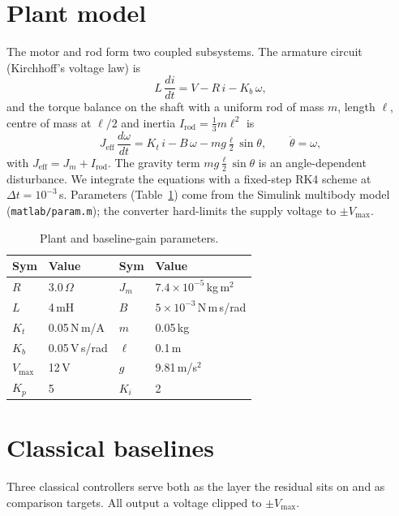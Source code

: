 \documentclass[10pt,twocolumn]{article}
\begin{document}
\section{Plant model}
The motor and rod form two coupled subsystems. The armature circuit
(Kirchhoff's voltage law) is
\begin{equation}
  L\,\frac{di}{dt} = V - R\,i - K_b\,\omega ,
  \label{eq:elec}
\end{equation}
and the torque balance on the shaft with a uniform rod of mass $m$,
length $\ell$, centre of mass at $\ell/2$ and inertia
$I_{\mathrm{rod}}=\tfrac13 m\ell^2$ is
\begin{equation}
  J_{\mathrm{eff}}\,\frac{d\omega}{dt}
    = K_t\,i - B\,\omega - m g \tfrac{\ell}{2}\sin\theta,
  \qquad \dot\theta = \omega,
  \label{eq:mech}
\end{equation}
with $J_{\mathrm{eff}}=J_m+I_{\mathrm{rod}}$. The gravity term
$m g \tfrac{\ell}{2}\sin\theta$ is an angle-dependent disturbance. We
integrate the equations with a fixed-step RK4 scheme at
$\Delta t=10^{-3}$\,s. Parameters (Table~\ref{tab:params}) come from the
Simulink multibody model (\texttt{matlab/param.m}); the converter
hard-limits the supply voltage to $\pm V_{\max}$.

\begin{table}[h]
\centering
\caption{Plant and baseline-gain parameters.}
\label{tab:params}
\small
\begin{tabular}{llll}
\toprule
\textbf{Sym} & \textbf{Value} & \textbf{Sym} & \textbf{Value}\\
\midrule
$R$   & 3.0\,$\Omega$        & $J_m$  & $7.4\times10^{-5}$\,kg\,m$^2$\\
$L$   & 4\,mH                & $B$    & $5\times10^{-3}$\,N\,m\,s/rad\\
$K_t$ & 0.05\,N\,m/A         & $m$    & 0.05\,kg\\
$K_b$ & 0.05\,V\,s/rad       & $\ell$ & 0.1\,m\\
$V_{\max}$ & 12\,V           & $g$    & 9.81\,m/s$^2$\\
$K_p$ & 5                    & $K_i$  & 2\\
\bottomrule
\end{tabular}
\end{table}

\section{Classical baselines}
Three classical controllers serve both as the layer the residual sits
on and as comparison targets. All output a voltage clipped to
$\pm V_{\max}$.
\end{document}
